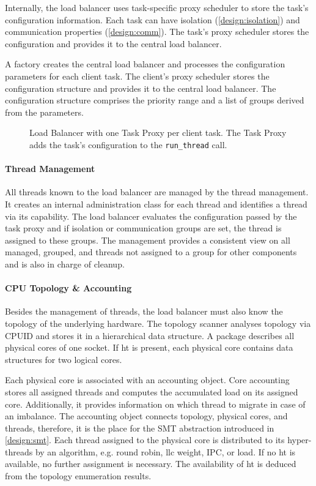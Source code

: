 Internally, the load balancer uses task-specific proxy scheduler to store the
task's configuration information.
Each task can have isolation (\ref{design:isolation}) and communication
properties (\ref{design:comm}).
The task's proxy scheduler stores the configuration and provides it to the
central load balancer.

A factory creates the central load balancer and processes the configuration
parameters for each client task.
The client's proxy scheduler stores the configuration structure and provides it
to the central load balancer.
The configuration structure comprises the priority range and a list of
groups derived from the parameters.

\begin{figure}[h!]
  \setcapindent*{1em}
  \begin{captionbeside}[]{Load Balancer with one Task Proxy per client task.
      The Task Proxy adds the task's configuration to the \texttt{run\_thread}
    call.}
  
\end{captionbeside}
  \label{state:figbalancer_proxy}
\end{figure}


\paragraph{Thread Management}
All threads known to the load balancer are managed by the thread management.
It creates an internal administration class for each thread and identifies a
thread via its capability.
The load balancer evaluates the configuration passed by the task proxy and
if isolation or communication groups are set, the thread is assigned to these
groups.
The management provides a consistent view on all managed, grouped, and threads
not assigned to a group for other components and is also in charge of cleanup.


\paragraph{CPU Topology \& Accounting}
Besides the management of threads, the load balancer must also know the
topology of the underlying hardware.
The topology scanner analyses topology via CPUID and stores it in a
hierarchical data structure.
A package describes all physical cores of one socket.
If \gls{ht} is present, each physical core contains data structures for
two logical cores.

Each physical core is associated with an accounting object.
Core accounting stores all assigned threads and computes the accumulated
load on its assigned core.
Additionally, it provides information on which thread to migrate in case of an
imbalance.
The accounting object connects topology, physical cores, and threads, therefore,
it is the place for the SMT abstraction introduced in \ref{design:smt}.
Each thread assigned to the physical core is distributed to its hyper-threads
by an algorithm, e.g. round robin, \gls{llc} weight, IPC, or load.
If no \gls{ht} is available, no further assignment is necessary.
The availability of \gls{ht} is deduced from the topology enumeration results.


